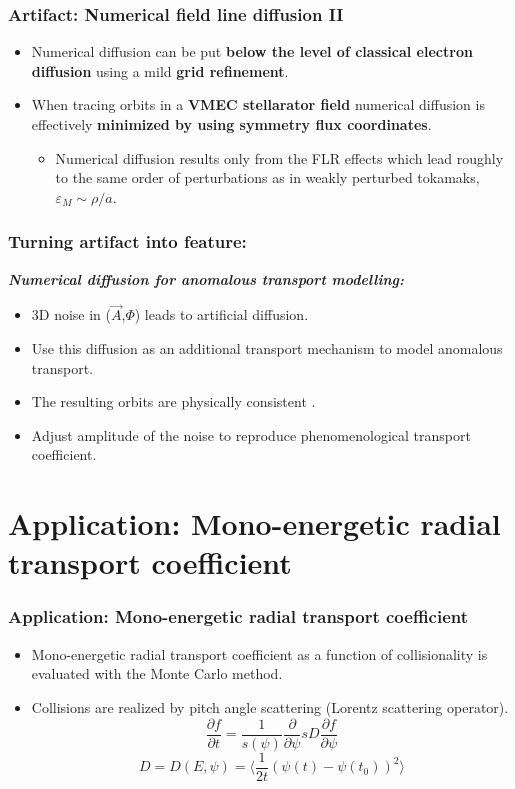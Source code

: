 \documentclass{beamer}
\newcommand{\be}[1]{\begin{equation} \label{#1}}
\newcommand{\ee}{\end{equation}}
\begin{document}
\begin{frame}
\frametitle{Artifact: Numerical field line diffusion II}
\vspace{-0.5cm}
\begin{itemize}
	\item Numerical diffusion can be put \textbf{below the level of classical electron diffusion}
	using a mild \textbf{grid refinement}.
	\item
	When tracing orbits in a \textbf{VMEC stellarator field} numerical diffusion is effectively \textbf{minimized by using symmetry flux coordinates}.
	\begin{itemize}
	\item Numerical diffusion results only from the FLR effects which lead roughly to the same
	order of perturbations as in weakly perturbed tokamaks, $\varepsilon_M \sim \rho/a$.
\end{itemize} 
	\end{itemize}
\end{frame}

\begin{frame}
\frametitle{Turning artifact into feature:}
\vspace*{-0.5cm}
\textit{\textbf{Numerical diffusion for anomalous transport modelling:}}
\begin{itemize}
	\item 3D noise in ($\vec{A}$,$\Phi$) leads to artificial diffusion.
	\item Use this diffusion as an additional transport mechanism
	to model anomalous transport.
	\item The resulting orbits are physically consistent .
	\item Adjust amplitude of the noise to reproduce phenomenological transport coefficient.
\end{itemize}

\end{frame}

\section{Application: Mono-energetic radial transport coefficient}


\begin{frame}
\frametitle{Application: Mono-energetic radial transport coefficient}
\vspace{-0.5cm}
\begin{itemize}
	\item Mono-energetic radial transport coefficient as a function of collisionality is evaluated with the Monte Carlo method.
	\item Collisions are realized by pitch angle scattering (Lorentz scattering operator).\\
	\be{}
	\frac{\partial f}{\partial t} = \frac{1}{s \left(\psi \right)} \frac{\partial}{\partial \psi}s D 	\frac{\partial f}{\partial \psi} 
	\ee
	\be{}
	D = D(E,\psi) = \langle \frac{1}{2t} \left( \psi  \left(t\right) - \psi \left( t_0 \right) \right)^2 \rangle
	\ee
\end{itemize}
\end{frame}
\end{document}
